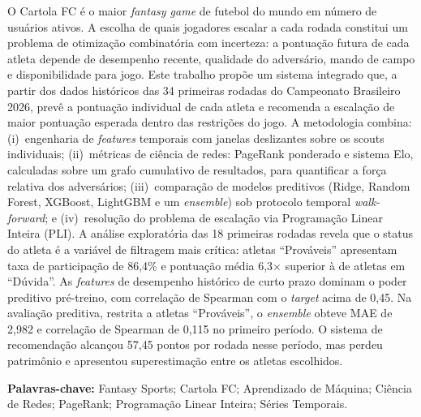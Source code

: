 \documentclass[12pt, a4paper, oneside]{article}
\begin{document}
O Cartola FC é o maior \textit{fantasy game} de futebol do mundo em número de usuários
ativos. A escolha de quais jogadores escalar a cada rodada constitui um problema de
otimização combinatória com incerteza: a pontuação futura de cada atleta depende de
desempenho recente, qualidade do adversário, mando de campo e disponibilidade para jogo.
Este trabalho propõe um sistema integrado que, a partir dos dados históricos
das 34 primeiras rodadas do Campeonato Brasileiro 2026, prevê a pontuação individual de
cada atleta e recomenda a escalação de maior pontuação esperada dentro das restrições do
jogo. A metodologia combina: (i)~engenharia de \textit{features} temporais com janelas
deslizantes sobre os scouts individuais; (ii)~métricas de ciência de redes:
PageRank ponderado e sistema Elo, calculadas sobre um grafo cumulativo de resultados,
para quantificar a força relativa dos adversários; (iii)~comparação de modelos preditivos
(Ridge, Random Forest, XGBoost, LightGBM e um \textit{ensemble}) sob protocolo temporal
\textit{walk-forward}; e (iv)~resolução do problema de escalação via Programação Linear
Inteira (PLI). A análise exploratória das 18 primeiras rodadas revela que o status do atleta é a variável de
filtragem mais crítica: atletas ``Prováveis'' apresentam taxa de participação de 86,4\%
e pontuação média 6,3$\times$ superior à de atletas em ``Dúvida''. As \textit{features}
de desempenho histórico de curto prazo dominam o poder preditivo pré-treino, com
correlação de Spearman com o \textit{target} acima de 0,45. Na avaliação preditiva,
restrita a atletas ``Prováveis'', o \textit{ensemble} obteve MAE de 2,982 e
correlação de Spearman de 0,115 no primeiro período. O sistema de recomendação
alcançou 57,45 pontos por rodada nesse período, mas perdeu patrimônio e apresentou
superestimação entre os atletas escolhidos.

\vspace{1em}\noindent
\textbf{Palavras-chave:} Fantasy Sports; Cartola FC; Aprendizado de Máquina;
Ciência de Redes; PageRank; Programação Linear Inteira; Séries Temporais.

\newpage

\thispagestyle{empty}
\tableofcontents
\newpage


\end{document}
